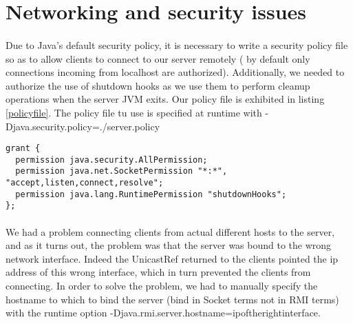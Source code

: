 \documentclass[times, 8pt,twocolumn]{article}
\begin{document}
\section{Networking and security issues}
\paragraph{} Due to Java's default security policy, it is necessary to write a security policy file so as to allow clients to connect to our server remotely ( by default only connections incoming from localhost are authorized). Additionally, we needed to authorize the use of shutdown hooks as we use them to perform cleanup operations when the server JVM exits. Our policy file is exhibited in listing \ref{policyfile}. The policy file tu use is specified at runtime with -Djava.security.policy=./server.policy

\begin{lstlisting}[caption={Policy file},label=policyfile]
grant {
  permission java.security.AllPermission;
  permission java.net.SocketPermission "*:*", "accept,listen,connect,resolve";
  permission java.lang.RuntimePermission "shutdownHooks";
};
\end{lstlisting}

\paragraph{} We had a problem connecting clients from actual different hosts to the server, and as it turns out, the problem was that the server was bound to the wrong network interface. Indeed the UnicastRef returned to the clients pointed the ip address of this wrong interface, which in turn prevented the clients from connecting. In order to solve the problem, we had to manually specify the hostname to which to bind the server (bind in Socket terms not in RMI terms) with the runtime option -Djava.rmi.server.hostname=ipoftherightinterface.
\end{document}
